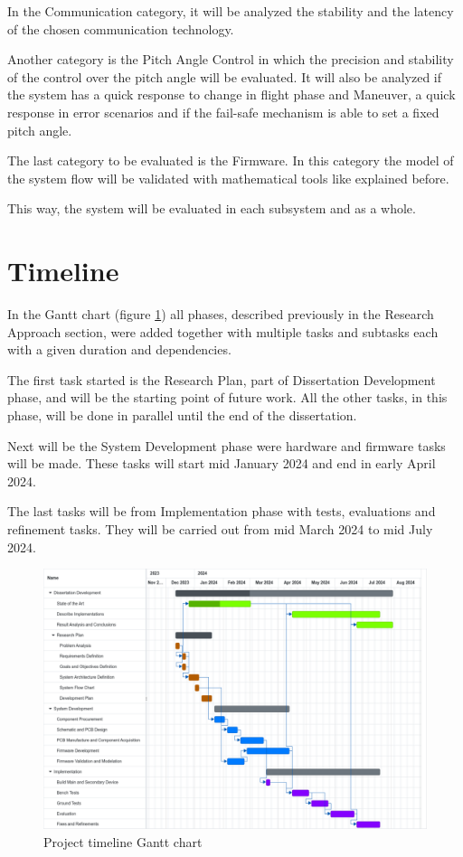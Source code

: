 In the Communication category, it will be analyzed the stability and the latency of the chosen communication technology.

Another category is the Pitch Angle Control in which the precision and stability of the control over the pitch angle will be evaluated.
It will also be analyzed if the system has a quick response to change in flight phase and Maneuver, a quick response in error scenarios and if the fail-safe mechanism is able to set a fixed pitch angle.

The last category to be evaluated is the Firmware.
In this category the model of the system flow will be validated with mathematical tools like explained before.

This way, the system will be evaluated in each subsystem and as a whole.


\section{Timeline}
In the Gantt chart (figure \ref{fig:gantt}) all phases, described previously in the Research Approach section, were added together with multiple tasks and subtasks each with a given duration and dependencies.

The first task started is the Research Plan, part of Dissertation Development phase, and will be the starting point of future work.
All the other tasks, in this phase, will be done in parallel until the end of the dissertation.

Next will be the System Development phase were hardware and firmware tasks will be made.
These tasks will start mid January 2024 and end in early April 2024.

The last tasks will be from Implementation phase with tests, evaluations and refinement tasks.
They will be carried out from mid March 2024 to mid July 2024.

\begin{figure}[H]
    \centering
    \includegraphics[width=\textwidth,keepaspectratio]{ch4/assets/gantt.pdf}
    \caption{Project timeline Gantt chart}
    \label{fig:gantt}
\end{figure}

